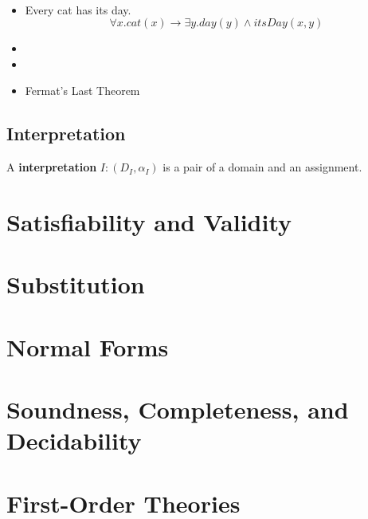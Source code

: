 \begin{example}
\ \begin{itemize}
	\item Every cat has its day. \[
	\forall x.cat(x)\to\exists y.day(y)\land itsDay(x,y)
	\]
	\item 
	\item 
	\item Fermat's Last Theorem
\end{itemize}
\end{example}

\subsection{Interpretation}
A \fol \textbf{interpretation} $I:(D_I,\alpha_I)$ is a pair of a domain and an assignment.

\section{Satisfiability and Validity}

\section{Substitution}

\section{Normal Forms}

\section{Soundness, Completeness, and Decidability}

\section{First-Order Theories}